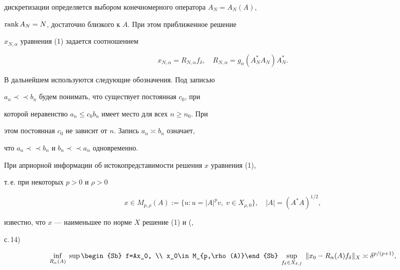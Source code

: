 дискретизации определяется выбором конечномерного оператора $A_N=A_N(A)$,


$\text{rank\,}A_N=N$, достаточно близкого к $A$. При этом приближенное решение


$x_{N,\alpha}$ уравнения (1) задается соотношением


\begin{equation}


x_{N,\alpha} = R_{N,\alpha}f_\delta, \quad


R_{N,\alpha} = g_\alpha(A_N^*A_N)A_N^*.


\end{equation}





В дальнейшем используются следующие обозначения. Под записью


$a_n\prec\prec b_n$ будем понимать, что существует постоянная $c_0$, при


которой неравенство $a_n\le c_0 b_n$ имеет место для всех $n\ge n_0$. При


этом постоянная $c_0$ не зависит от $n$. Запись $a_n\asymp b_n$ означает,


что $a_n\prec\prec b_n$ и $b_n\prec\prec a_n$ одновременно.





При априорной информации об истокопредставимости решения $x$ уравнения (1),


т.\,е. при некоторых $p>0$ и $\rho>0$


$$


x \in M_{p,\rho}(A) := \{u: u=|A|^p v,\; v\in X_{\rho,0}\},


\quad   |A|=(A^*A)^{1/2},


$$


известно, что $x$ --- наименьшее по норме $X$ решение (1) и (\cite{VV},


с.\,14)


\begin{equation}


\inf_{R_\alpha(A)}\;


\sup\begin{Sb} f=Ax_0, \\ x_0\in M_{p,\rho(A)}\end{Sb} \;


\sup_{f_\delta\in X_{\delta,f}}\;


\|x_0 - R_\alpha(A)f_\delta\|_X \asymp \delta^{p/(p+1)},


\end{equation}


